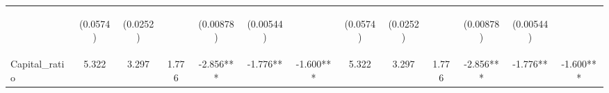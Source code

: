 \documentclass[]{article}
\begin{document}
\begin{center}
\begin{tabular}{lcccccccccccc}
\vspace{4pt} & \begin{footnotesize}(0.0574)\end{footnotesize} & \begin{footnotesize}(0.0252)\end{footnotesize} & \begin{footnotesize}\end{footnotesize} & \begin{footnotesize}(0.00878)\end{footnotesize} & \begin{footnotesize}(0.00544)\end{footnotesize} & \begin{footnotesize}\end{footnotesize} & \begin{footnotesize}(0.0574)\end{footnotesize} & \begin{footnotesize}(0.0252)\end{footnotesize} & \begin{footnotesize}\end{footnotesize} & \begin{footnotesize}(0.00878)\end{footnotesize} & \begin{footnotesize}(0.00544)\end{footnotesize} & \begin{footnotesize}\end{footnotesize} \\
Capital\_ratio & 5.322 & 3.297 & 1.776 & -2.856*** & -1.776** & -1.600*** & 5.322 & 3.297 & 1.776 & -2.856*** & -1.776** & -1.600*** \\

\end{tabular}
\end{center}
\end{document}

